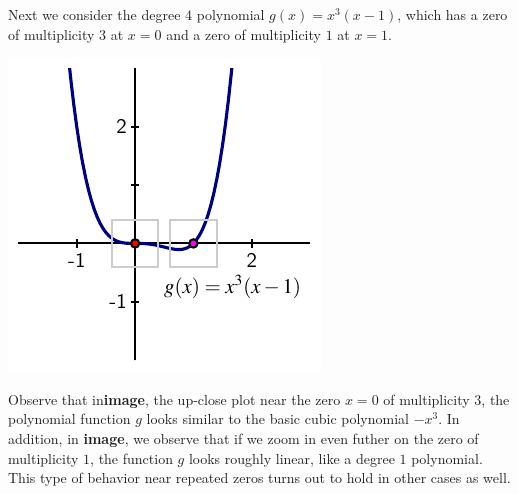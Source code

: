 \documentclass{ximera}
\begin{document}
Next we consider the degree $4$ polynomial $g(x) = x^3 (x-1)$, which has a zero of multiplicity $3$ at $x = 0$ and a zero of multiplicity $1$ at $x = 1$.%
\begin{image}
\includegraphics[width=0.5\linewidth]{images/polynomial-3-1.pdf}
\end{image}
Observe that in\textbf{image}, the up-close plot near the zero $x = 0$ of multiplicity $3$, the polynomial function $g$ looks similar to the basic cubic polynomial $-x^3$.  In addition, in \textbf{image}, we observe that if we zoom in even futher on the zero of multiplicity $1$, the function $g$ looks roughly linear, like a degree $1$ polynomial.  This type of behavior near repeated zeros turns out to hold in other cases as well.%
\end{document}

